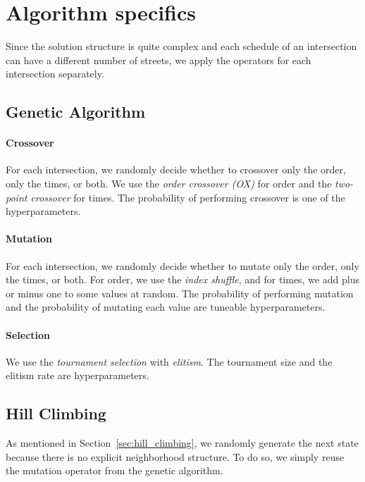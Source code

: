 \section{Algorithm specifics}

Since the solution structure is quite complex and each schedule of an intersection can have a different number of streets, we apply the operators for each intersection separately.

\subsection*{Genetic Algorithm}

\paragraph{Crossover}

For each intersection, we randomly decide whether to crossover only the order, only the times, or both. We use the \textit{order crossover (OX)} for order and the \textit{two-point crossover} for times. The probability of performing crossover is one of the hyperparameters.

\paragraph{Mutation}

For each intersection, we randomly decide whether to mutate only the order, only the times, or both. For order, we use the \textit{index shuffle}, and for times, we add plus or minus one to some values at random. The probability of performing mutation and the probability of mutating each value are tuneable hyperparameters.

\paragraph{Selection}

We use the \textit{tournament selection} with \textit{elitism}. The tournament size and the elitism rate are hyperparameters.

\subsection*{Hill Climbing}

As mentioned in Section~\ref{sec:hill_climbing}, we randomly generate the next state because there is no explicit neighborhood structure. To do so, we simply reuse the mutation operator from the genetic algorithm.

